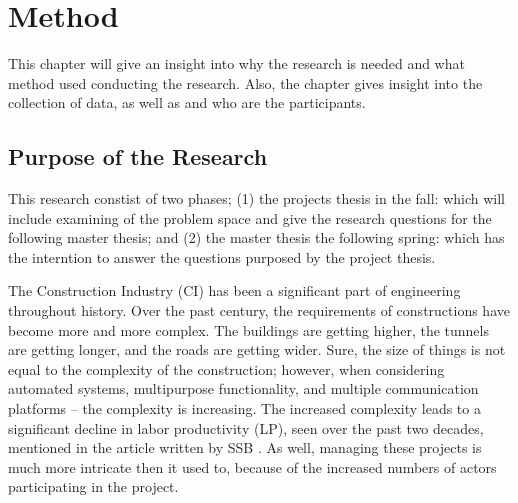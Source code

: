 
\chapter{Method}
This chapter will give an insight into why the research is needed and what method used conducting the research. Also, the chapter gives insight into the collection of data,  as well as and who are the participants.

\section{Purpose of the Research} \label{sec:purpose}


This research constist of two phases; (1) the projects thesis in the fall: which will include examining of the problem space and give the research questions for the following master thesis; and (2) the master thesis the following spring: which has the interntion to answer the questions purposed by the project thesis.

The Construction Industry (CI) has been a significant part of engineering throughout history. Over the past century, the requirements of constructions have become more and more complex. The buildings are getting higher, the tunnels are getting longer, and the roads are getting wider. Sure, the size of things is not equal to the complexity of the construction; however, when considering automated systems, multipurpose functionality, and multiple communication platforms – the complexity is increasing. The increased complexity leads to a significant decline in labor productivity (LP), seen over the past two decades, mentioned in the article written by SSB \cite{productivity}. As well, managing these projects is much more intricate then it used to, because of the increased numbers of actors participating in the project. 


